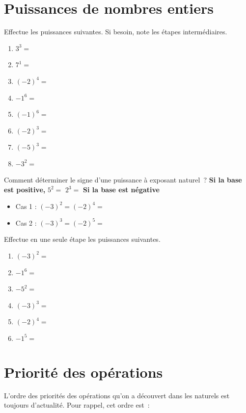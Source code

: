 \documentclass[../../syllabus_1.tex]{subfiles}
\begin{document}
\newpage
\section{Puissances de nombres entiers}
Effectue les puissances suivantes. Si besoin, note les étapes intermédiaires.
\begin{enumerate}[itemsep=1.5cm, cols=2]
    \item \(3^{3} =\)
    \item \(7^{1} =\)
    \item \(( - 2)^{4} =\)
    \item \({- 1}^{6} =\)
    \item \(( - 1)^{6} =\)
    \item \(( - 2)^{3} =\)
    \item \((-5)^3=\)
    \item \(-3^2=\)
\end{enumerate}
\vspace{1cm}

Comment déterminer le signe d'une puissance à exposant naturel~?
\vfill
\textbf{Si la base est positive,} 
\exemples
\(5^{2}=\) \hfil \(2^3=\)
\vfill
\textbf{Si la base est négative}
\begin{itemize}[wide]
    \item Cas 1 : 
          \exemples
          \((- 3)^{2} = \)\hfil\( ( - 2)^{4} =\)
          \vfill
    \item Cas 2 : 
          \exemples
          \(( - 3)^{3} = \)\hfil\( ( - 2)^{5} =\)
\end{itemize}
\vspace{1cm}

\begin{exercise}
    Effectue en une seule étape les puissances suivantes. 
    \begin{enumerate}[cols=2, itemsep=0.5cm]
        \item \((-3)^2=\)
        \item \(-1^6=\)
        \item \(-5^2=\)
        \item \((-3)^3=\)
        \item \((-2)^4=\)
        \item \(-1^5=\)
    \end{enumerate}
\end{exercise}

\newpage
\section{Priorité des opérations}
L'ordre des priorités des opérations qu'on a découvert dans les naturels est toujours d'actualité. Pour rappel, cet ordre est~:
\vspace{3cm}
\end{document}
